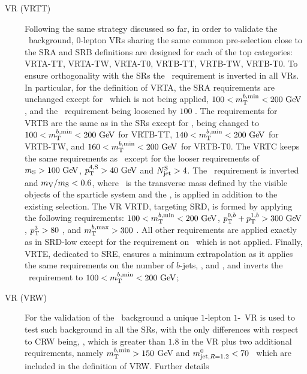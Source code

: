\begin{description}
				\item [\ttbar\ VR (VRTT)] Following the same strategy discussed so far, in order to validate the \ttbar\ background, $0$-lepton \acp{VR} sharing the same common pre-selection close to the SRA and SRB definitions are designed for each of the top categories: VRTA-TT, VRTA-TW, VRTA-T0, VRTB-TT, VRTB-TW, VRTB-T0. To ensure orthogonality with the \acp{SR} the \mtbmin\ requirement is inverted in all \acp{VR}. In particular, for the definition of VRTA, the SRA requirements are unchanged except for \mttwo\, which is not being applied, $100<\mtbmin<200\gev$, and the \met\ requirement being loosened by $100$ \GeV. The requirements for VRTB are the same as in the \acp{SR} except for \mtbmin, being changed to $100<\mtbmin<200\gev$ for VRTB-TT, $140<\mtbmin<200\gev$ for VRTB-TW, and $160<\mtbmin<200\gev$ for VRTB-T0. The VRTC keeps the same requirements as \SRC\ except for the looser requirements of $\mS> 100\gev$, $\pTSFour>40\gev$ and $N_{\mathrm{jet}}^{\mathrm{S}} > 4$. The \dPhiISRMET\ requirement is inverted and $m_{\mathrm{V}}/m_{\mathrm{S}}<0.6$, where \mV\ is the transverse mass defined by the visible objects of the sparticle system and the \met, is applied in addition to the existing selection. The \ac{VR} VRTD, targeting SRD, is formed by applying the following requirements: $100<\mtbmin<200\gev$, $\ptbzero+\ptbone>300\gev$, $p_{\mathrm{T}}^{3}>80$ \GeV, and $m_{\mathrm{T}}^{b,\mathrm{max}}>300$ \GeV. All other requirements are applied exactly as in SRD-low except for the requirement on \ptfour\ which is not applied. Finally, VRTE, dedicated to SRE, ensures a minimum extrapolation as it applies the same requirements on the number of $b$-jets, \mantikteightzero, and \mantikteightone, and inverts the \mtbmin\ requirement to $100<\mtbmin<200\gev$;

				\item [\Wjets\ VR (VRW)] For the validation of the \Wjets\ background a unique $1$-lepton $1$-\bj\ \ac{VR} is used to test such background in all the \acp{SR}, with the only differences with respect to CRW being, \mindrblep, which is greater than $1.8$ in the \ac{VR} plus two additional requirements, namely $m_{\mathrm{T}}^{b,\mathrm{min}}>150$ GeV and $m^{0}_{\mathrm{jet,}R=1.2}<70$ \GeV\ which are included in the definition of VRW. Further details



			\end{description}

